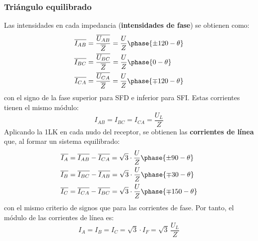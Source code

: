 \documentclass[11pt]{book} %
\begin{document}
	\subsubsection{Triángulo equilibrado}
	Las intensidades en cada impedancia (\textbf{intensidades de fase}) se obtienen como: 
	\begin{align*}
          \overline{I_{AB}} &= \frac{\overline{U_{AB}}}{\overline{Z}} = \frac{U}{Z}\phase{{\pm 120} - \theta} \\
          \overline{I_{BC}} &= \frac{\overline{U_{BC}}}{\overline{Z}} = \frac{U}{Z}\phase{0 - \theta}\\
          \overline{I_{CA}} &= \frac{\overline{U_{CA}}}{\overline{Z}} = \frac{U}{Z}\phase{{\mp 120} - \theta}
    \end{align*}
    con el signo de la fase superior para SFD e inferior para SFI. Estas corrientes tienen el mismo módulo: 
    \begin{equation}
        \boxed{{I_{AB}}={I_{BC}}={I_{CA}} = \dfrac{U_L}{Z}}
    \end{equation}
    Aplicando la 1LK en cada nudo del receptor, se obtienen las \textbf{corrientes de línea} que, al formar un sistema equilibrado: 
    \begin{align}
      \overline{I_A} &= \overline{I_{AB}} - \overline{I_{CA}} = \sqrt{3} \cdot \frac{U}{Z}\phase{{\pm 90} - \theta}\\
      \overline{I_B} &= \overline{I_{BC}} - \overline{I_{AB}} = \sqrt{3} \cdot \frac{U}{Z}\phase{{\mp 30} - \theta}\\
      \overline{I_C} &= \overline{I_{CA}} - \overline{I_{BC}} = \sqrt{3} \cdot \frac{U}{Z}\phase{{\mp 150} - \theta}
    \end{align}
    con el mismo criterio de signos que para las corrientes de fase. Por tanto, el módulo de las corrientes de línea es: 
    \begin{equation}
        \boxed{{I}_A = {I}_B = {I}_C = \sqrt{3} \cdot I_F = \sqrt{3}\,\frac{U_L}{Z}}
    \end{equation}
	
\end{document}
